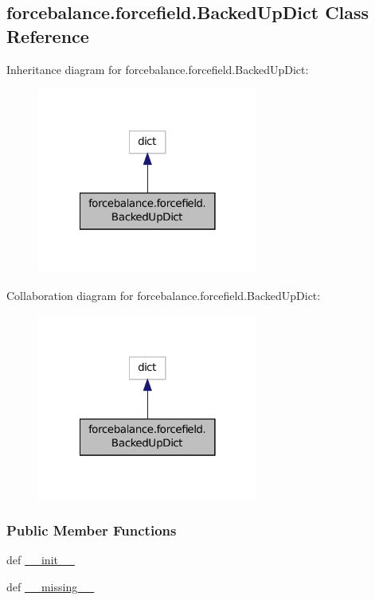 \hypertarget{classforcebalance_1_1forcefield_1_1BackedUpDict}{\subsection{forcebalance.\-forcefield.\-Backed\-Up\-Dict Class Reference}
\label{classforcebalance_1_1forcefield_1_1BackedUpDict}
}


Inheritance diagram for forcebalance.\-forcefield.\-Backed\-Up\-Dict\-:\nopagebreak
\begin{figure}[H]
\begin{center}
\leavevmode
\includegraphics[width=206pt]{classforcebalance_1_1forcefield_1_1BackedUpDict__inherit__graph}
\end{center}
\end{figure}


Collaboration diagram for forcebalance.\-forcefield.\-Backed\-Up\-Dict\-:\nopagebreak
\begin{figure}[H]
\begin{center}
\leavevmode
\includegraphics[width=206pt]{classforcebalance_1_1forcefield_1_1BackedUpDict__coll__graph}
\end{center}
\end{figure}
\subsubsection*{Public Member Functions}
\begin{DoxyCompactItemize}
\item 
def \hyperlink{classforcebalance_1_1forcefield_1_1BackedUpDict_a82e592b405ab38fa3c9d4e0fd27d3545}{\-\_\-\-\_\-init\-\_\-\-\_\-}
\item 
def \hyperlink{classforcebalance_1_1forcefield_1_1BackedUpDict_a1b1c8443d8927bfad95b880dc3dc9594}{\-\_\-\-\_\-missing\-\_\-\-\_\-}
\end{DoxyCompactItemize}
